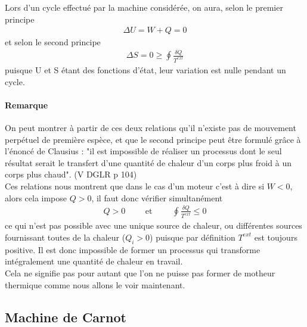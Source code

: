\documentclass[12pt,prb,aps,epsf]{report}
\begin{document}
Lors d'un cycle effectué par la machine considérée, on aura, selon le premier principe 
\begin{eqnarray}
\Delta U =  W + Q = 0
\end{eqnarray}
et selon le second principe 
\begin{eqnarray}
\Delta S = 0 \geq \oint \frac{\delta Q}{T^{ext}}
\end{eqnarray}
puisque U et S étant des fonctions d'état, leur variation est nulle pendant un cycle.

\paragraph{Remarque} On peut montrer à partir de ces deux relations qu'il n'existe pas de mouvement perpétuel de première espèce, et que le second principe peut être formulé grâce à l'énoncé de Clausius : "il est impossible de réaliser un processus dont le seul résultat serait le transfert d'une quantité de chaleur d'un corps plus froid à un corps plus chaud". (V DGLR p 104)\\

Ces relations nous montrent que dans le cas d'un moteur c'est à dire si $W < 0$, alors cela impose $Q > 0$, il faut donc vérifier simultanément 
\begin{eqnarray}
Q > 0 \hspace{1cm}\mathrm{et} \hspace{1cm} \oint \frac{\delta Q}{T^{ext}} \leq 0
\end{eqnarray} 
ce qui n'est pas possible avec une unique source de chaleur, ou différentes sources fournissant toutes de la chaleur ($Q_i >0$) puisque par définition $T^{ext}$ est toujours positive. Il est donc impossible de former un processus qui transforme intégralement une quantité de chaleur en travail.\\
Cela ne signifie pas pour autant que l'on ne puisse pas former de motheur thermique comme nous allons le voir maintenant.

\subsection{Machine de Carnot}
\end{document}
